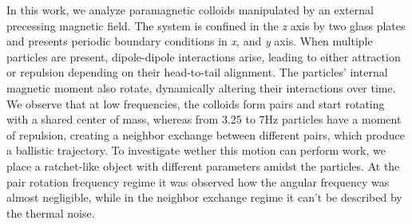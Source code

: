 In this work, we analyze paramagnetic colloids manipulated by an external precessing magnetic field. The system is confined in the \textit{z} axis by two glass plates and presents periodic boundary conditions in \textit{x}, and \textit{y} axis. When multiple particles are present, dipole-dipole interactions arise, leading to either attraction or repulsion depending on their head-to-tail alignment. The particles' internal magnetic moment also rotate, dynamically altering their interactions over time. We observe that at low frequencies, the colloids form pairs and start rotating with a shared center of mass, whereas from 3.25 to 7Hz particles have a moment of repulsion, creating a neighbor exchange between different pairs, which produce a ballistic trajectory. To investigate wether this motion can perform work, we place a ratchet-like object with different parameters amidst the particles. At the pair rotation frequency regime it was observed how the angular frequency was almost negligible, while in the neighbor exchange regime it can't be described by the thermal noise.

\newpage %

\listoffigures
{}

\listoftables
{}

\tableofcontents
\newpage

